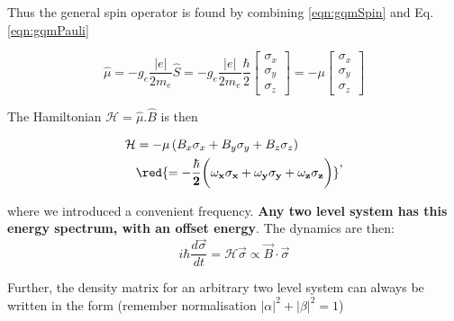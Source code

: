   \noindent  Thus  the  general  spin operator  is  found  by  combining
  \eqref{eqn:gqmSpin} and Eq. \ref{eqn:gqmPauli}

  \begin{equation}
    \hat{\mu} = -g_e\frac{|e|}{2m_e}\hat{S} = -g_e\frac{|e|}{2m_e}\frac{\hbar}{2}\begin{bmatrix}
      \sigma_x\\\sigma_y\\\sigma_z
    \end{bmatrix} = -\mu\begin{bmatrix} \sigma_x\\\sigma_y\\\sigma_z
    \end{bmatrix}
  \end{equation}

  \noindent The Hamiltonian $\mathcal{H} = \hat{\mu}.\hat{B}$ is then

  \begin{equation}
    \begin{aligned}
      \mathcal{H} & = -\mu\left(B_x\sigma_x+B_y\sigma_y+B_z\sigma_z\right)\\
      &                          \red{\mathbf{                         =
          -\frac{\hbar}{2}\bigg(\omega_x\sigma_x+\omega_y\sigma_y+\omega_z\sigma_z\bigg)}}
    \end{aligned},
  \end{equation}

  \noindent where we introduced  a convenient frequency. \textbf{Any two
    level system has  this energy spectrum, with an  offset energy}. The
  dynamics are then:
  \begin{equation}\label{eqn:evolutionBloch}
    i\hbar\frac{d\vec{\sigma}}{dt} = \mathcal{H}\vec{\sigma} \propto \vec{B}\cdot\vec{\sigma}
  \end{equation}

  Further,  the density  matrix for  an arbitrary  two level  system can
  always   be    written   in    the   form    (remember   normalisation
  $|\alpha|^2+|\beta|^2 = 1$)

